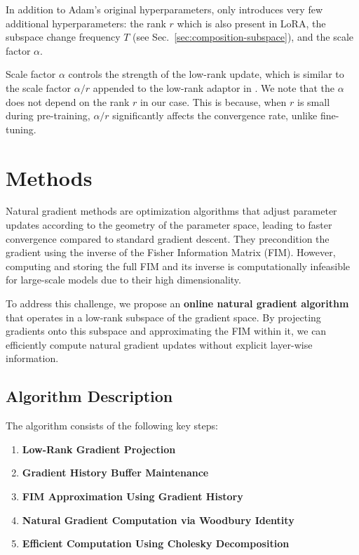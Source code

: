 In addition to Adam's original hyperparameters, \lowrank{} only introduces very few additional hyperparameters: the rank $r$ which is also present in LoRA, the subspace change frequency $T$ (see Sec.~\ref{sec:composition-subspace}), and the scale factor $\alpha$. 

Scale factor $\alpha$ controls the strength of the low-rank update, which is similar to the scale factor $\alpha/r$ appended to the low-rank adaptor in \citet{huLoRALowRankAdaptation2021}.
We note that the $\alpha$ does not depend on the rank $r$ in our case. 
This is because, when $r$ is small during pre-training, $\alpha/r$ significantly affects the convergence rate, unlike fine-tuning.






\section{Methods}

Natural gradient methods are optimization algorithms that adjust parameter updates according to the geometry of the parameter space, leading to faster convergence compared to standard gradient descent. They precondition the gradient using the inverse of the Fisher Information Matrix (FIM). However, computing and storing the full FIM and its inverse is computationally infeasible for large-scale models due to their high dimensionality.

To address this challenge, we propose an \textbf{online natural gradient algorithm} that operates in a low-rank subspace of the gradient space. By projecting gradients onto this subspace and approximating the FIM within it, we can efficiently compute natural gradient updates without explicit layer-wise information.

\subsection{Algorithm Description}

The algorithm consists of the following key steps:

\begin{enumerate}
    \item \textbf{Low-Rank Gradient Projection}
    \item \textbf{Gradient History Buffer Maintenance}
    \item \textbf{FIM Approximation Using Gradient History}
    \item \textbf{Natural Gradient Computation via Woodbury Identity}
    \item \textbf{Efficient Computation Using Cholesky Decomposition}
\end{enumerate}

